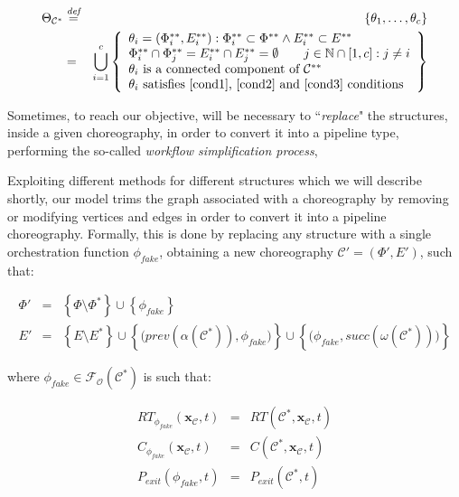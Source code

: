 \documentclass[12pt,a4paper]{report}
\newcommand{\mathDef}{\overset{\textit{def}}{=}}
\newcommand{\N}{\mathbb{N}}
\newcommand{\SetFromOneTo}[1]{\N \cap \left[1,#1\right]}
\newcommand{\ItalicQuotMark}[1]{``\textit{#1}"}
\begin{document}
\begin{eqnarray}
	\Theta_{\mathcal{C}^*} & \mathDef & \left\lbrace \theta_1, \ldots ,\theta_c \right\rbrace \\ & = & \bigcup_{i = 1}^c \left\{ \begin{array}{l}
		\theta_i = (\Phi^{**}_i, E^{**}_i) : \Phi^{**}_i \subset \Phi^{**} \wedge E^{**}_i \subset E^{**} \\ 
		\Phi^{**}_i \cap \Phi^{**}_j = E^{**}_i \cap E^{**}_j = \emptyset \qquad j \in \SetFromOneTo{c}: j \neq i \\
		\text{$\theta_i$ is a connected component of $\mathcal{C}^{**}$} \\	
		\text{$\theta_i$ satisfies \ref{cond1}, \ref{cond2} and \ref{cond3} conditions}
	\end{array} \right\} \nonumber
\end{eqnarray}

Sometimes, to reach our objective, will be necessary to \ItalicQuotMark{replace} the structures, inside a given choreography, in order to convert it into a pipeline type, performing the so-called \textit{workflow simplification process},

Exploiting different methods for different structures which we will describe shortly, our model trims the graph associated with a choreography by removing or modifying vertices and edges in order to convert it into a pipeline choreography. Formally, this is done by replacing any structure with a single orchestration function $\phi_{fake}$, obtaining a new choreography $\mathcal{C}' = (\Phi',E')$, such that:

\begin{eqnarray}
	\Phi' & = & \left\{ \Phi \setminus \Phi^* \right\} \cup \left\{ \phi_{fake} \right\} \\
	E' & = & \left\{ E \setminus E^* \right\} \cup \left\{\bigg(prev(\alpha(\mathcal{C}^*)), \phi_{fake}\bigg) \right\} \cup \left\{\bigg(\phi_{fake}, succ(\omega(\mathcal{C}^*)) \bigg) \right\}
\end{eqnarray}

where $\phi_{fake} \in \mathscr{F_O}(\mathcal{C}^*)$ is such that:

\begin{eqnarray}
	RT_{\phi_{fake}}(\textbf{x}_{\mathcal{C}}, t) & = & RT(\mathcal{C}^*,\textbf{x}_{\mathcal{C}}, t) \\
	C_{\phi_{fake}}(\textbf{x}_{\mathcal{C}}, t) & = & C(\mathcal{C}^*,\textbf{x}_{\mathcal{C}}, t) \\
	P_{exit}(\phi_{fake}, t) & = & P_{exit}(\mathcal{C}^*, t)
\end{eqnarray}
\end{document}
